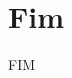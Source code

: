 \documentclass{beamer}
\begin{document}
\section{Fim}

\begin{frame}
    \centering
    \Large
    FIM
\end{frame}
    
\end{document}
